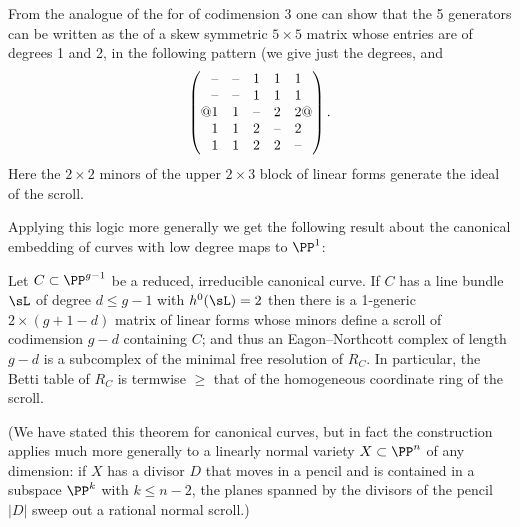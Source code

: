 From the analogue of the 
%
 for 
%
of
codimension 3 one can show that the 5 generators can be written as the
%
of a skew symmetric $5\times 5$ matrix whose entries are of
degrees 1 and 2, in the following pattern (we give just the degrees,
and 
$$
\catcode`\-=\active \def-{\hbox{\char`\-\char`\-}}
\left(@
\begin{matrix}
-&-&1&1&1\\
-&-&1&1&1\\
1&1&-&2&2\\
1&1&2&-&2\\
1&1&2&2&-
\end{matrix}
@\right)
.
$$
Here the $2\times 2$ minors of the upper $2\times 3$ block of linear
forms generate the ideal of the scroll.

Applying this logic more generally we get the following result about
the canonical embedding of curves with low degree maps to $\PP^1$:

\begin{theorem}
Let $C\subset \PP^{g-1}$ be a reduced, irreducible canonical curve. If
$C$ has a line bundle $\sL$ of degree $d \leq g-1$ with $h^0(\sL) =
2$  then
there is a 1-generic  $2\times (g+1-d)$ matrix of linear forms whose
minors define a scroll of codimension $g-d$ containing $C$; and thus an
Eagon--Northcott complex of length $g-d$ is a subcomplex of the minimal
free resolution of $R_C$. In particular, the Betti table of $R_C$ is
%
termwise $\geq$ that of the homogeneous coordinate ring of the scroll.
\unif
\end{theorem}

(We have stated this theorem for canonical curves, but in fact the
construction applies much more generally to a linearly normal variety
$X \subset \PP^n$ of any dimension: if $X$ has a divisor $D$ that moves
in a pencil and is contained in a subspace $\PP^k$ with $k \leq n-2$,
the planes spanned by the divisors of the pencil $|D|$ sweep out a
rational normal scroll.)

